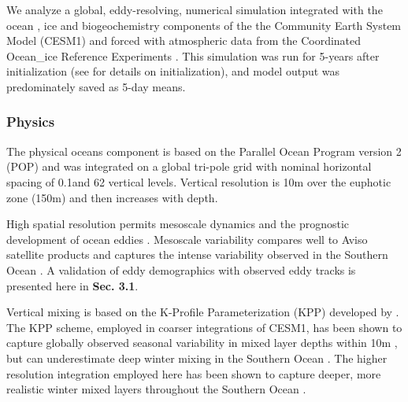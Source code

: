 \documentclass{article}
\begin{document}
We analyze a global, eddy-resolving, numerical simulation integrated with the ocean \parencite{SmithParallelOceanProgram2010}, ice \parencite{HunkeCICEAlamosSea2008} and biogeochemistry \parencite{MooreMarineEcosystemDynamics2013} components of the the Community Earth System Model (CESM1) \parencite{HurrellCommunityEarthSystem2013} and forced with atmospheric data from the Coordinated Ocean\_ice Reference Experiments \parencite{LargeDiurnaldecadalglobal2004, GriffiesCoordinatedOceaniceReference2009}. This simulation was run for 5-years after initialization (see \textcite{HarrisonMesoscaleEffectsCarbon2018} for details on initialization), and model output was predominately saved as 5-day means. 


\subsubsection{Physics}

The physical oceans component is based on the Parallel Ocean Program version 2 (POP) \parencite{SmithParallelOceanProgram2010} and was integrated on a global tri-pole grid with nominal horizontal spacing of 0.1\degree and 62 vertical levels. Vertical resolution is 10m over the euphotic zone (150m) and then increases with depth. 

High spatial resolution permits mesoscale dynamics and the prognostic development of ocean eddies \parencite{Longrolemesoscaleeddies2018}. Mesoscale variability compares well to Aviso satellite products and captures the intense variability observed in the Southern Ocean \parencite{Longrolemesoscaleeddies2018}. A validation of eddy demographics with observed eddy tracks is presented here in \textbf{Sec. 3.1}.

Vertical mixing is based on the K-Profile Parameterization (KPP) developed by \textcite{LargeOceanicverticalmixing1994}. The KPP scheme, employed in coarser integrations of CESM1, has been shown to capture globally observed seasonal variability in mixed layer depths within 10m \parencite{MooreMarineEcosystemDynamics2013}, but can underestimate deep winter mixing in the Southern Ocean \parencite{MooreMarineEcosystemDynamics2013,WeijerSouthernOceanIts2011}. The higher resolution integration employed here has been shown to capture deeper, more realistic winter mixed layers throughout the Southern Ocean \parencite{Longrolemesoscaleeddies2018, HarrisonMesoscaleEffectsCarbon2018}.
\end{document}
